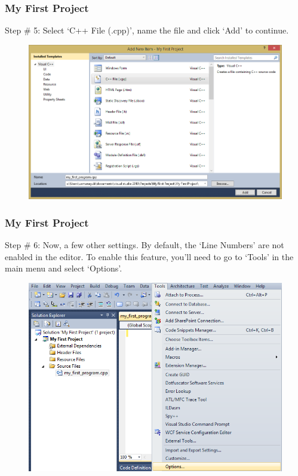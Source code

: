 \documentclass{beamer}
\begin{document}
\begin{frame}
    \frametitle{My First Project}
    Step \# 5: Select `C++ File (.cpp)', name the file and click `Add' to continue.
    \begin{figure}
        \centering
        \includegraphics[scale=0.42]{step_11}
    \end{figure}
\end{frame}

\begin{frame}
    \frametitle{My First Project}
    Step \# 6: Now, a few other settings. By default, the `Line Numbers' are not enabled in the editor. To enable this feature, you'll need to go to `Tools' in the main menu and select `Options'.
    \begin{figure}
        \centering
        \includegraphics[scale=0.42]{step_12}
    \end{figure}
\end{frame}
\end{document}
